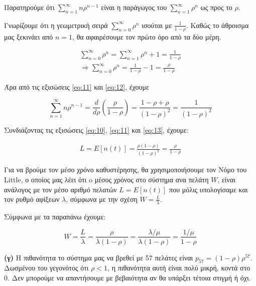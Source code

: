 \documentclass {article}
\begin{document}
Παρατηρούμε ότι $\sum_{n=1}^{\infty}{n ρ^{n-1}}$ είναι η παράγωγος του $\sum_{n=1}^{\infty}{ρ^n}$ ως προς το $ρ$. 

Γνωρίζουμε ότι η γεωμετρική σειρά $\sum_{n=0}^{\infty}{ρ^n}$ ισούται με $\frac{1}{1-ρ}$. Καθώς το άθροισμα μας ξεκινάει από $n = 1$, θα αφαιρέσουμε τον πρώτο όρο από τα δύο μέρη.

\begin{equation} \label{eq:12}
	\begin{split}
		\sum_{n=0}^{\infty}{ρ^n} = \sum_{n=1}^{\infty}{ρ^n} + 1 = \frac{1}{1-ρ}\\
	\Rightarrow \sum_{n=0}^{\infty}{ρ^n} = \frac{1}{1-ρ} - 1 = \frac{ρ}{1-ρ}
	\end{split}
\end{equation}

Άρα από τις εξισώσεις \ref{eq:11} και \ref{eq:12}, έχουμε 

\begin{equation} \label{eq:13}
	\sum_{n=1}^{\infty}{nρ^{n-1}} = \frac{d}{dρ}(\frac{ρ}{1-ρ}) = \frac{1-ρ+ρ}{(1-ρ)^2} = \frac{1}{(1-ρ)^2} 
\end{equation}

Συνδιάζοντας τις εξισώσεις \ref{eq:10}, \ref{eq:11} και \ref{eq:13}, έχουμε:

\begin{equation}
	\begin{split}
		L = E[n(t)] = \frac{ρ(1-ρ)}{(1-ρ)^2} = \frac{ρ}{1-ρ}
	\end{split}	
\end{equation}

Για να βρούμε τον μέσο χρόνο καθυστέρησης, θα χρησιμοποιήσουμε τον Νόμο του \foreignlanguage{english}{Little}, ο οποίος μας λέει ότι o μέσος χρόνος στο σύστημα ανα πελάτη $W$, είναι ανάλογος με τον μέσο αριθμό πελατών $L = E[n(t)]$ που μόλις υπολογίσαμε και τον ρυθμό αφίξεων $λ$, σύμφωνα με την σχέση $W = \frac{L}{λ}$.

Σύμφωνα με τα παραπάνω έχουμε:

\begin{equation}
	W = \frac{L}{λ} = \frac{ρ}{λ(1-ρ)} = \frac{λ / μ}{λ(1-ρ)} = \frac{1 / μ}{1-ρ}
\end{equation}

\textbf{(γ)} Η πιθανότητα το σύστημα μας να βρεθεί με 57 πελάτες είναι $p_{57} = (1-ρ)ρ^{57}$. Δωσμένου του γεγονότος ότι $ρ < 1$, η πιθανότητα αυτή είναι πολύ μικρή, κοντά στο 0. Δεν μπορούμε να απαντήσουμε με βεβαιότητα αν θα υπάρξει τέτοια στιγμή ή όχι.
\end{document}
